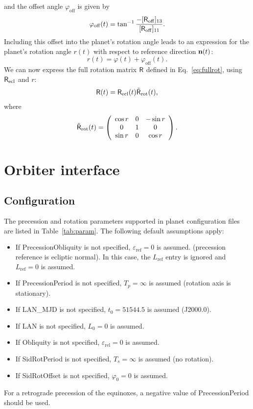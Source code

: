 \documentclass[a4paper]{article}
\renewcommand{\vec}[1]{\ensuremath \mathbf{#1}}
\newcommand{\mat}[1]{\ensuremath \mathsf{#1}}
\begin{document}
and the offset angle $\varphi_\mathrm{off}$ is given by
\begin{equation}
\varphi_\mathrm{off}(t) = \tan^{-1} \frac{-[\mat{R}_\mathrm{off}]_{13}}{[\mat{R}_\mathrm{off}]_{11}}.
\end{equation}
Including this offset into the planet's rotation angle leads to an expression for the planet's rotation angle $r(t)$ with respect to reference direction $\vec{n}(t)$:
\begin{equation}\label{eq:rotangle}
r(t) = \varphi(t) + \varphi_\mathrm{off}(t).
\end{equation}
We can now express the full rotation matrix $\mat{R}$ defined in Eq.~\ref{eq:fullrot}, using $\mat{R}_\mathrm{ecl}$ and $r$:
\begin{equation}
\mat{R}(t) = \mat{R}_\mathrm{ecl}(t) \tilde{\mat{R}}_\mathrm{rot}(t),
\end{equation}
where
\begin{equation}
\tilde{\mat{R}}_\mathrm{rot}(t) = \left( \begin{array}{ccc}
\cos r & 0 & -\sin r \\
0 & 1 & 0 \\
\sin r & 0 & \cos r
\end{array} \right).
\end{equation}

\section{Orbiter interface}
\subsection{Configuration}
The precession and rotation parameters supported in planet configuration files are listed in Table~\ref{tab:param}.
The following default assumptions apply:
\begin{itemize}
\item If PrecessionObliquity is not specified, $\varepsilon_\mathrm{ref}=0$ is assumed. (precession reference is ecliptic normal). In this case, the $L_\mathrm{ref}$ entry is ignored and $L_\mathrm{ref}=0$ is assumed.
\item If PrecessionPeriod is not specified, $T_p = \infty$ is assumed (rotation axis is stationary).
\item If LAN\_MJD is not specified, $t_0 = 51544.5$ is assumed (J2000.0).
\item If LAN is not specified, $L_0=0$ is assumed.
\item If Obliquity is not specified, $\varepsilon_\mathrm{rel}=0$ is assumed.
\item If SidRotPeriod is not specified, $T_s=\infty$ is assumed (no rotation).
\item If SidRotOffset is not specified, $\varphi_0=0$ is assumed.
\end{itemize}
For a retrograde precession of the equinoxes, a negative value of PrecessionPeriod should be used.
\end{document}
